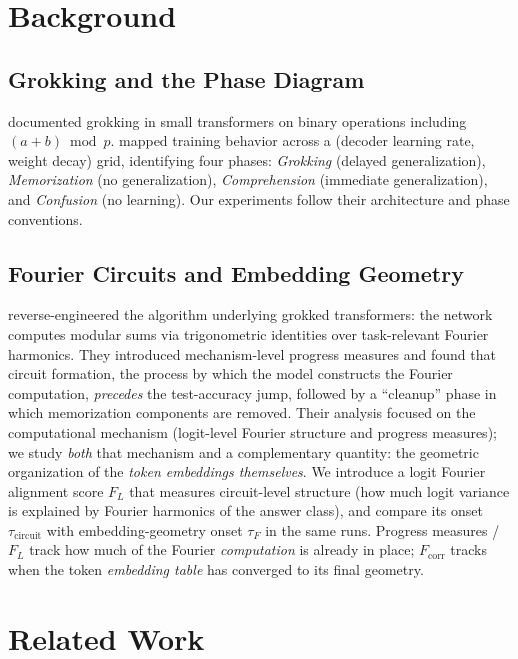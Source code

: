 \documentclass{article}
\newcommand{\tauf}{\tau_{F}}
\newcommand{\taucirc}{\tau_{\mathrm{circuit}}}
\newcommand{\fcorr}{F_{\mathrm{corr}}}
\newcommand{\flogit}{F_{L}}
\begin{document}
\section{Background}
\label{app:background_extended}
\label{sec:background}

\subsection{Grokking and the Phase Diagram}

\citet{power2022grokking} documented grokking in small transformers on
binary operations including $(a+b)\bmod p$.
\citet{liu2022towards} mapped training behavior across a
(decoder learning rate, weight decay) grid, identifying four phases:
\textit{Grokking} (delayed generalization), \textit{Memorization} (no
generalization), \textit{Comprehension} (immediate generalization),
and \textit{Confusion} (no learning).
Our experiments follow their architecture and phase conventions.

\subsection{Fourier Circuits and Embedding Geometry}

\citet{nanda2023progress} reverse-engineered the algorithm underlying
grokked transformers: the network computes modular sums via
trigonometric identities over task-relevant Fourier harmonics.
They introduced mechanism-level progress measures and found that
circuit formation, the process by which the model constructs the
Fourier computation, \emph{precedes} the test-accuracy jump,
followed by a ``cleanup'' phase in which memorization components are
removed.
Their analysis focused on the computational mechanism (logit-level
Fourier structure and progress measures); we study \emph{both} that
mechanism and a complementary quantity: the geometric organization of
the \emph{token embeddings themselves}.
We introduce a logit Fourier alignment score $\flogit$ that measures
circuit-level structure (how much logit variance is explained by
Fourier harmonics of the answer class), and compare its onset
$\taucirc$ with embedding-geometry onset $\tauf$ in the same runs.
Progress measures / $\flogit$ track how much of the Fourier
\emph{computation} is already in place; $\fcorr$ tracks when the
token \emph{embedding table} has converged to its final geometry.

\section{Related Work}
\label{sec:related}
\end{document}

